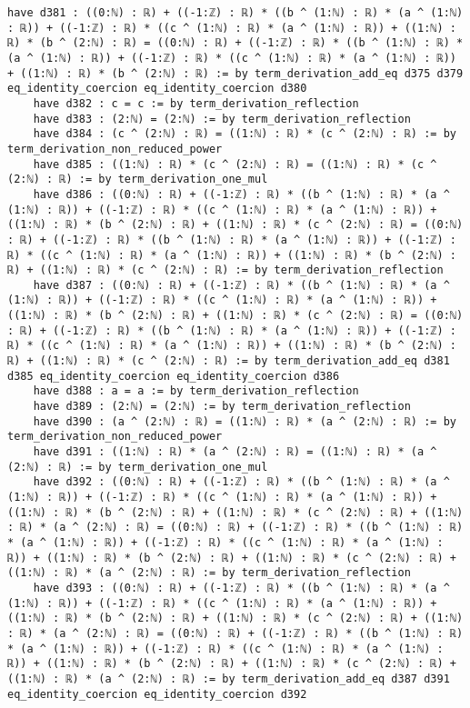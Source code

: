 \documentclass{article}
\begin{document}
\begin{tcolorbox}[colback=white!10, width=\linewidth]
\begin{lstlisting}[language=Lean4]
    have d381 : ((0:ℕ) : ℝ) + ((-1:ℤ) : ℝ) * ((b ^ (1:ℕ) : ℝ) * (a ^ (1:ℕ) : ℝ)) + ((-1:ℤ) : ℝ) * ((c ^ (1:ℕ) : ℝ) * (a ^ (1:ℕ) : ℝ)) + ((1:ℕ) : ℝ) * (b ^ (2:ℕ) : ℝ) = ((0:ℕ) : ℝ) + ((-1:ℤ) : ℝ) * ((b ^ (1:ℕ) : ℝ) * (a ^ (1:ℕ) : ℝ)) + ((-1:ℤ) : ℝ) * ((c ^ (1:ℕ) : ℝ) * (a ^ (1:ℕ) : ℝ)) + ((1:ℕ) : ℝ) * (b ^ (2:ℕ) : ℝ) := by term_derivation_add_eq d375 d379 eq_identity_coercion eq_identity_coercion d380
    have d382 : c = c := by term_derivation_reflection
    have d383 : (2:ℕ) = (2:ℕ) := by term_derivation_reflection
    have d384 : (c ^ (2:ℕ) : ℝ) = ((1:ℕ) : ℝ) * (c ^ (2:ℕ) : ℝ) := by term_derivation_non_reduced_power
    have d385 : ((1:ℕ) : ℝ) * (c ^ (2:ℕ) : ℝ) = ((1:ℕ) : ℝ) * (c ^ (2:ℕ) : ℝ) := by term_derivation_one_mul
    have d386 : ((0:ℕ) : ℝ) + ((-1:ℤ) : ℝ) * ((b ^ (1:ℕ) : ℝ) * (a ^ (1:ℕ) : ℝ)) + ((-1:ℤ) : ℝ) * ((c ^ (1:ℕ) : ℝ) * (a ^ (1:ℕ) : ℝ)) + ((1:ℕ) : ℝ) * (b ^ (2:ℕ) : ℝ) + ((1:ℕ) : ℝ) * (c ^ (2:ℕ) : ℝ) = ((0:ℕ) : ℝ) + ((-1:ℤ) : ℝ) * ((b ^ (1:ℕ) : ℝ) * (a ^ (1:ℕ) : ℝ)) + ((-1:ℤ) : ℝ) * ((c ^ (1:ℕ) : ℝ) * (a ^ (1:ℕ) : ℝ)) + ((1:ℕ) : ℝ) * (b ^ (2:ℕ) : ℝ) + ((1:ℕ) : ℝ) * (c ^ (2:ℕ) : ℝ) := by term_derivation_reflection
    have d387 : ((0:ℕ) : ℝ) + ((-1:ℤ) : ℝ) * ((b ^ (1:ℕ) : ℝ) * (a ^ (1:ℕ) : ℝ)) + ((-1:ℤ) : ℝ) * ((c ^ (1:ℕ) : ℝ) * (a ^ (1:ℕ) : ℝ)) + ((1:ℕ) : ℝ) * (b ^ (2:ℕ) : ℝ) + ((1:ℕ) : ℝ) * (c ^ (2:ℕ) : ℝ) = ((0:ℕ) : ℝ) + ((-1:ℤ) : ℝ) * ((b ^ (1:ℕ) : ℝ) * (a ^ (1:ℕ) : ℝ)) + ((-1:ℤ) : ℝ) * ((c ^ (1:ℕ) : ℝ) * (a ^ (1:ℕ) : ℝ)) + ((1:ℕ) : ℝ) * (b ^ (2:ℕ) : ℝ) + ((1:ℕ) : ℝ) * (c ^ (2:ℕ) : ℝ) := by term_derivation_add_eq d381 d385 eq_identity_coercion eq_identity_coercion d386
    have d388 : a = a := by term_derivation_reflection
    have d389 : (2:ℕ) = (2:ℕ) := by term_derivation_reflection
    have d390 : (a ^ (2:ℕ) : ℝ) = ((1:ℕ) : ℝ) * (a ^ (2:ℕ) : ℝ) := by term_derivation_non_reduced_power
    have d391 : ((1:ℕ) : ℝ) * (a ^ (2:ℕ) : ℝ) = ((1:ℕ) : ℝ) * (a ^ (2:ℕ) : ℝ) := by term_derivation_one_mul
    have d392 : ((0:ℕ) : ℝ) + ((-1:ℤ) : ℝ) * ((b ^ (1:ℕ) : ℝ) * (a ^ (1:ℕ) : ℝ)) + ((-1:ℤ) : ℝ) * ((c ^ (1:ℕ) : ℝ) * (a ^ (1:ℕ) : ℝ)) + ((1:ℕ) : ℝ) * (b ^ (2:ℕ) : ℝ) + ((1:ℕ) : ℝ) * (c ^ (2:ℕ) : ℝ) + ((1:ℕ) : ℝ) * (a ^ (2:ℕ) : ℝ) = ((0:ℕ) : ℝ) + ((-1:ℤ) : ℝ) * ((b ^ (1:ℕ) : ℝ) * (a ^ (1:ℕ) : ℝ)) + ((-1:ℤ) : ℝ) * ((c ^ (1:ℕ) : ℝ) * (a ^ (1:ℕ) : ℝ)) + ((1:ℕ) : ℝ) * (b ^ (2:ℕ) : ℝ) + ((1:ℕ) : ℝ) * (c ^ (2:ℕ) : ℝ) + ((1:ℕ) : ℝ) * (a ^ (2:ℕ) : ℝ) := by term_derivation_reflection
    have d393 : ((0:ℕ) : ℝ) + ((-1:ℤ) : ℝ) * ((b ^ (1:ℕ) : ℝ) * (a ^ (1:ℕ) : ℝ)) + ((-1:ℤ) : ℝ) * ((c ^ (1:ℕ) : ℝ) * (a ^ (1:ℕ) : ℝ)) + ((1:ℕ) : ℝ) * (b ^ (2:ℕ) : ℝ) + ((1:ℕ) : ℝ) * (c ^ (2:ℕ) : ℝ) + ((1:ℕ) : ℝ) * (a ^ (2:ℕ) : ℝ) = ((0:ℕ) : ℝ) + ((-1:ℤ) : ℝ) * ((b ^ (1:ℕ) : ℝ) * (a ^ (1:ℕ) : ℝ)) + ((-1:ℤ) : ℝ) * ((c ^ (1:ℕ) : ℝ) * (a ^ (1:ℕ) : ℝ)) + ((1:ℕ) : ℝ) * (b ^ (2:ℕ) : ℝ) + ((1:ℕ) : ℝ) * (c ^ (2:ℕ) : ℝ) + ((1:ℕ) : ℝ) * (a ^ (2:ℕ) : ℝ) := by term_derivation_add_eq d387 d391 eq_identity_coercion eq_identity_coercion d392

\end{lstlisting}
\end{tcolorbox}
\end{document}
